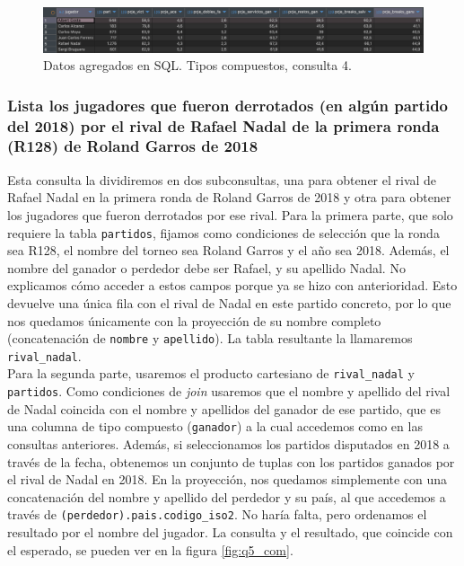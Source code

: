 \begin{figure}[H]
\centering
\includegraphics[width=\textwidth]{fotos/q4_com.png}
\caption{Datos agregados en SQL. Tipos compuestos, consulta 4.}
\label{fig:q4_com}
\end{figure}





\subsubsection{Lista los jugadores que fueron derrotados (en algún partido del 2018) por el rival de Rafael Nadal de la primera ronda (R128) de Roland Garros de 2018}

Esta consulta la dividiremos en dos subconsultas, una para obtener el rival de Rafael Nadal en la primera ronda de Roland Garros de 2018 y otra para obtener los jugadores que fueron derrotados por ese rival. Para la primera parte, que solo requiere la tabla \texttt{partidos}, fijamos como condiciones de selección que la ronda sea R128, el nombre del torneo sea Roland Garros y el año sea 2018. Además, el nombre del ganador o perdedor debe ser Rafael, y su apellido Nadal. No explicamos cómo acceder a estos campos porque ya se hizo con anterioridad. Esto devuelve una única fila con el rival de Nadal en este partido concreto, por lo que nos quedamos únicamente con la proyección de su nombre completo (concatenación de \texttt{nombre} y \texttt{apellido}). La tabla resultante la llamaremos \texttt{rival\_nadal}. \\

Para la segunda parte, usaremos el producto cartesiano de \texttt{rival\_nadal} y \texttt{partidos}. Como condiciones de \textit{join} usaremos que el nombre y apellido del rival de Nadal coincida con el nombre y apellidos del ganador de ese partido, que es una columna de tipo compuesto (\texttt{ganador}) a la cual accedemos como en las consultas anteriores. Además, si seleccionamos los partidos disputados en 2018 a través de la fecha, obtenemos un conjunto de tuplas con los partidos ganados por el rival de Nadal en 2018. En la proyección, nos quedamos simplemente con una concatenación del nombre y apellido del perdedor y su país, al que accedemos a través de \texttt{(perdedor).pais.codigo\_iso2}. No haría falta, pero ordenamos el resultado por el nombre del jugador. La consulta y el resultado, que coincide con el esperado, se pueden ver en la figura \ref{fig:q5_com}.

